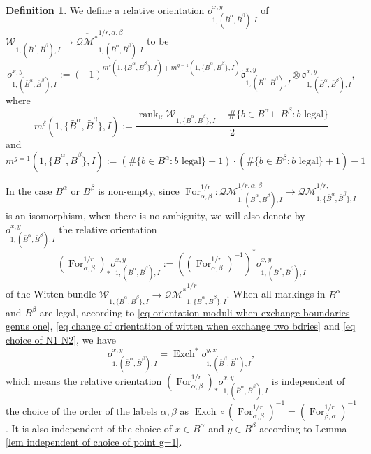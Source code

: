 \documentclass[11pt,a4paper]{article}
\theoremstyle{definition}
\newtheorem{dfn}[dummy]{Definition}
\theoremstyle{remark}
\numberwithin{equation}{section}
\begin{document}
\begin{dfn}
    We define a relative orientation ${ o}^{x,y}_{1,(\bar B^\alpha, \bar B^\beta ),I}$ of  $\mathcal W_{1,(\bar B^\alpha, \bar B^\beta ),I}\to \overline {\mathcal {QM}^*}^{1/r,\alpha,\beta}_{1,(\bar B^\alpha, \bar B^\beta ),I}$ to be \begin{equation}    \label{eq definition canonical orientation g=1}  
    { o}^{x,y}_{1,(\bar B^\alpha, \bar B^\beta ),I}:=(-1)^{m^\delta(1,\{\bar B^\alpha, \bar B^\beta \},I)+m^{g=1}(1,\{\bar B^\alpha, \bar B^\beta \},I)}\tilde{\mathfrak o}^{x,y}_{1,(\bar B^\alpha, \bar B^\beta ),I}\otimes {\mathfrak o}^{x,y}_{1,(\bar B^\alpha, \bar B^\beta ),I},
    \end{equation} 
    where 
    $$m^\delta(1,\{\bar B^\alpha, \bar B^\beta \},I):=\frac{\operatorname{rank}_{\mathbb R}\mathcal W_{1,\{\bar B^\alpha, \bar B^\beta \},I}-\#\{b\in B^\alpha\sqcup B^\beta\colon b \text{ legal}\}}{2}$$
    and 
    $$
    m^{g=1}(1,\{\bar B^\alpha, \bar B^\beta \},I):=(\#\{b\in B^\alpha\colon b \text{ legal}\}+1)\cdot (\#\{b\in B^\beta\colon b \text{ legal}\}+1)-1
    $$
\end{dfn}

In the case $B^\alpha$ or $B^\beta$ is non-empty, since $\operatorname{For}^{1/r}_{\alpha,\beta}\colon \overline {\mathcal {QM}}^{1/r,\alpha,\beta}_{1,(\bar B^\alpha, \bar B^\beta ),I} \to \overline {\mathcal {QM}}^{1/r,}_{1,\{\bar B^\alpha, \bar B^\beta \},I}$ is an isomorphism, when there is no ambiguity, we will also denote by ${ o}^{x,y}_{1,(\bar B^\alpha, \bar B^\beta ),I}$ the relative orientation
$$(\operatorname{For}_{\alpha,\beta}^{1/r})_* { o}^{x,y}_{1,(\bar B^\alpha, \bar B^\beta ),I}:=\left((\operatorname{For}_{\alpha,\beta}^{1/r})^{-1}\right)^* { o}^{x,y}_{1,(\bar B^\alpha, \bar B^\beta ),I}$$
of the Witten bundle $\mathcal W_{1,\{\bar B^\alpha, \bar B^\beta \},I}\to \overline {\mathcal {QM}^*}^{1/r}_{1,\{\bar B^\alpha, \bar B^\beta \},I}$.
When all markings in $B^\alpha$ and $B^\beta$ are legal, according to \eqref{eq orientation moduli when exchange boundaries genus one}, \eqref{eq change of orientation of witten when exchange two bdries} and \eqref{eq choice of N1 N2}, we have 
\begin{equation}\label{eq exchange boundaries relative}
{ o}^{x,y}_{1,(\bar B^\alpha, \bar B^\beta ),I}=\operatorname{Exch}^*{ o}^{y,x}_{1,(\bar B^\beta, \bar B^\alpha ),I},
\end{equation}
which means the relative orientation $(\operatorname{For}_{\alpha,\beta}^{1/r})_* { o}^{x,y}_{1,(\bar B^\alpha, \bar B^\beta ),I}$
is independent of the choice of the order of the labels $\alpha,\beta$ as $\operatorname{Exch}\circ(\operatorname{For}_{\alpha,\beta}^{1/r})^{-1}=(\operatorname{For}_{\beta,\alpha}^{1/r})^{-1}$. It is also independent of the choice of $x\in B^\alpha$ and $y\in B^\beta$ according to Lemma \ref{lem independent of choice of point g=1}.
\end{document}
